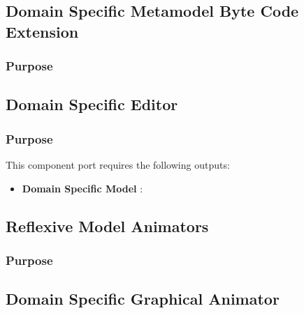 \documentclass{gemoc} %
\begin{document}


\subsection{Domain Specific Metamodel Byte Code Extension}


\subsubsection{Purpose}



\subsection{Domain Specific Editor}


\subsubsection{Purpose}


This component port requires the following outputs:
\begin{itemize}
  \item \textbf{Domain Specific Model} :
\end{itemize}

\subsection{Reflexive Model Animators}


\subsubsection{Purpose}



\subsection{Domain Specific Graphical Animator}
\end{document}
